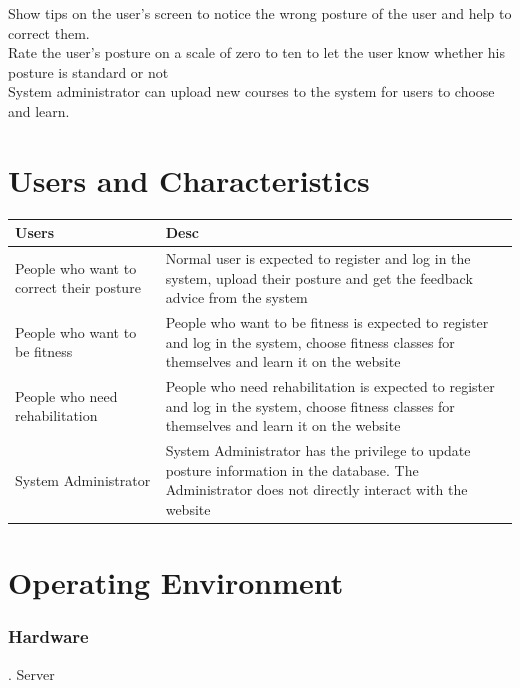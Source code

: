\documentclass[16pt]{scrreprt}
\begin{document}
Show tips on the user's screen to notice the wrong posture of the user and help to correct them.\\


Rate the user's posture on a scale of zero to ten to let the user know whether his posture is standard or not\\


System administrator can upload new courses to the system for users to choose and learn.\\

\section{Users and Characteristics}

 
\begin{center}
    \begin{tabular}{p{5cm}p{11cm}}
        \hline
	    Users & Desc\\
        \hline
	    People who want to correct their posture &  Normal user is expected to register and log in the system, upload their posture and get the feedback advice from the system\\
        \hline
	    People who want to be fitness & People who want to be fitness is expected to register and log in the system, choose fitness classes for themselves and learn it on the website\\
        \hline
        People who need rehabilitation & People who need rehabilitation is expected to register and log in the system, choose fitness classes for themselves and learn it on the website\\
        \hline
        System Administrator & System Administrator has the privilege to update posture information in the database. The Administrator does not directly interact with the website\\
        \hline
    \end{tabular}
\end{center}

 
\section{Operating Environment}

 
\subsubsection{Hardware}

 
. Server\\
\end{document}
